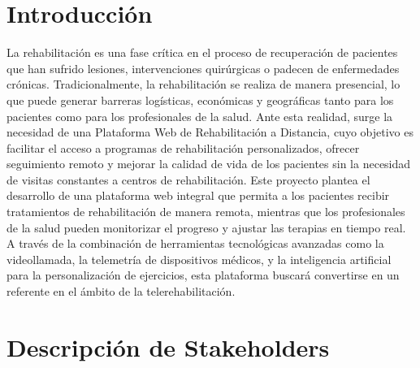 \documentclass{article}
\begin{document}
	\section{Introducción}
	La rehabilitación es una fase crítica en el proceso de recuperación de pacientes que han
	sufrido lesiones, intervenciones quirúrgicas o padecen de enfermedades crónicas.
	Tradicionalmente, la rehabilitación se realiza de manera presencial, lo que puede generar
	barreras logísticas, económicas y geográficas tanto para los pacientes como para los
	profesionales de la salud. Ante esta realidad, surge la necesidad de una Plataforma Web de
	Rehabilitación a Distancia, cuyo objetivo es facilitar el acceso a programas de rehabilitación
	personalizados, ofrecer seguimiento remoto y mejorar la calidad de vida de los pacientes sin
	la necesidad de visitas constantes a centros de rehabilitación.
	Este proyecto plantea el desarrollo de una plataforma web integral que permita a los
	pacientes recibir tratamientos de rehabilitación de manera remota, mientras que los
	profesionales de la salud pueden monitorizar el progreso y ajustar las terapias en tiempo real.
	A través de la combinación de herramientas tecnológicas avanzadas como la videollamada,
	la telemetría de dispositivos médicos, y la inteligencia artificial para la personalización de
	ejercicios, esta plataforma buscará convertirse en un referente en el ámbito de la telerehabilitación.
	
	\section{Descripción de Stakeholders}
	
\end{document}
